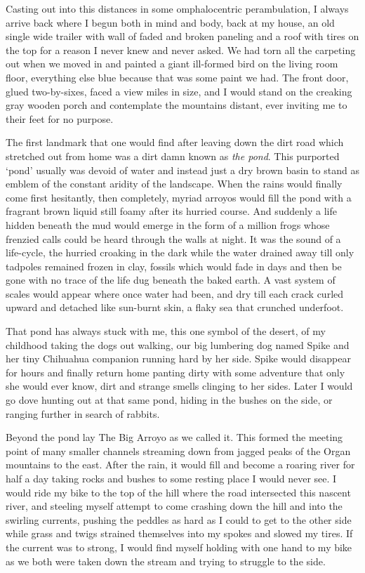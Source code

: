 \documentclass[ebook, 10pt, openright, onecolumn]{memoir}
\begin{document}
Casting out into this distances in some omphalocentric perambulation, I always
arrive back where I begun both in mind and body, back at my house, an old single
wide trailer with wall of faded and broken paneling and a roof with tires on the
top for a reason I never knew and never asked.  We had torn all the carpeting
out when we moved in and painted a giant ill-formed bird on the living room
floor, everything else blue because that was some paint we had. The front door,
glued two-by-sixes, faced a view miles in size, and I would stand on the
creaking gray wooden porch and contemplate the mountains distant, ever inviting
me to their feet for no purpose.

The first landmark that one would find after leaving down the dirt road which
stretched out from home was a dirt damn known as \textit{the pond}.  This
purported `pond' usually was devoid of water and instead just a dry brown basin
to stand as emblem of the constant aridity of the landscape.  When the rains
would finally come first hesitantly, then completely, myriad arroyos would fill
the pond with a fragrant brown liquid still foamy after its hurried course.  And
suddenly a life hidden beneath the mud would emerge in the form of a million
frogs whose frenzied calls could be heard through the walls at night.  It was
the sound of a life-cycle, the hurried croaking in the dark while the water
drained away till only tadpoles remained frozen in clay, fossils which would
fade in days and then be gone with no trace of the life dug beneath the baked
earth.  A vast system of scales would appear where once water had been, and dry
till each crack curled upward and detached like sun-burnt skin, a flaky sea
that crunched underfoot.

That pond has always stuck with me, this one symbol of the desert, of my
childhood taking the dogs out walking, our big lumbering dog named Spike and her
tiny Chihuahua companion running hard by her side.  Spike would disappear for
hours and finally return home panting dirty with some adventure that only she
would ever know, dirt and strange smells clinging to her sides.  Later I would
go dove hunting out at that same pond, hiding in the bushes on the side, or
ranging further in search of rabbits.

Beyond the pond lay The Big Arroyo as we called it.  This formed the meeting
point of many smaller channels streaming down from jagged peaks of the Organ
mountains to the east.  After the rain, it would fill and become a roaring river
for half a day taking rocks and bushes to some resting place I would never see.
I would ride my bike to the top of the hill where the road intersected this
nascent river, and steeling myself attempt to come crashing down the hill and
into the swirling currents, pushing the peddles as hard as I could to get to the
other side while grass and twigs strained themselves into my spokes and slowed
my tires.  If the current was to strong, I would find myself holding with one
hand to my bike as we both were taken down the stream and trying to struggle to
the side.
\end{document}
